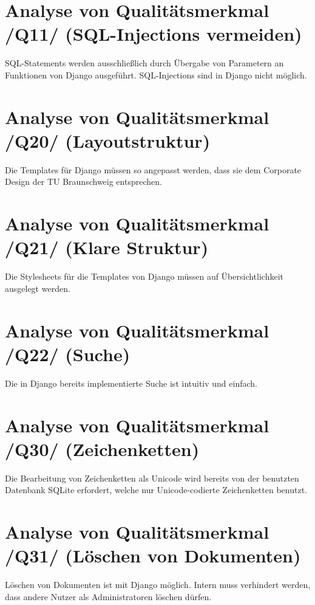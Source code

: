 \section{Analyse von Qualitätsmerkmal /Q11/ (SQL-Injections vermeiden)}
SQL-Statements werden ausschließlich durch Übergabe von Parametern an Funktionen von Django ausgeführt. SQL-Injections sind in Django nicht möglich.
\section{Analyse von Qualitätsmerkmal /Q20/ (Layoutstruktur)}
Die Templates für Django müssen so angepasst werden, dass sie dem Corporate Design der TU Braunschweig entsprechen.
\section{Analyse von Qualitätsmerkmal /Q21/ (Klare Struktur)}
Die Stylesheets für die Templates von Django müssen auf Übersichtlichkeit ausgelegt werden.
\section{Analyse von Qualitätsmerkmal /Q22/ (Suche)}
Die in Django bereits implementierte Suche ist intuitiv und einfach.
\section{Analyse von Qualitätsmerkmal /Q30/ (Zeichenketten)}
Die Bearbeitung von Zeichenketten als Unicode wird bereits von der benutzten Datenbank SQLite erfordert, welche nur Unicode-codierte Zeichenketten benutzt.
\section{Analyse von Qualitätsmerkmal /Q31/ (Löschen von Dokumenten)}
Löschen von Dokumenten ist mit Django möglich. Intern muss verhindert werden, dass andere Nutzer als Administratoren löschen dürfen.